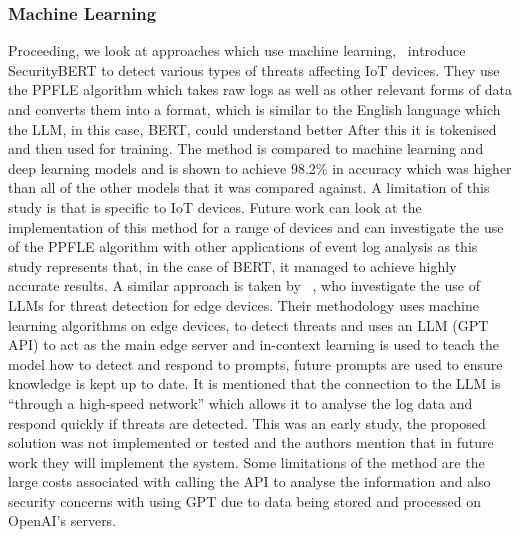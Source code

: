 \subsubsection{Machine Learning}
Proceeding, we look at approaches which use machine learning,~\cite{ferrag2024revolutionizing} introduce SecurityBERT to detect various types of threats affecting IoT devices. They use the PPFLE algorithm which takes raw logs as well as other relevant forms of data and converts them into a format, which is similar to the English language which the LLM, in this case, BERT, could understand better After this it is tokenised and then used for training. The method is compared to machine learning and deep learning models and is shown to achieve 98.2\% in accuracy which was higher than all of the other models that it was compared against. A limitation of this study is that is specific to IoT devices. Future work can look at the implementation of this method for a range of devices and can investigate the use of the PPFLE algorithm with other applications of event log analysis as this study represents that, in the case of BERT, it managed to achieve highly accurate results. A similar approach is taken by ~\cite{hasan2024distributed}, who investigate the use of LLMs for threat detection for edge devices. Their methodology uses machine learning algorithms on edge devices, to detect threats and uses an LLM (GPT API) to act as the main edge server and in-context learning is used to teach the model how to detect and respond to prompts, future prompts are used to ensure knowledge is kept up to date. It is mentioned that the connection to the LLM is ``through a high-speed network'' which allows it to analyse the log data and respond quickly if threats are detected. This was an early study, the proposed solution was not implemented or tested and the authors mention that in future work they will implement the system. Some limitations of the method are the large costs associated with calling the API to analyse the information and also security concerns with using GPT due to data being stored and processed on OpenAI's servers.

